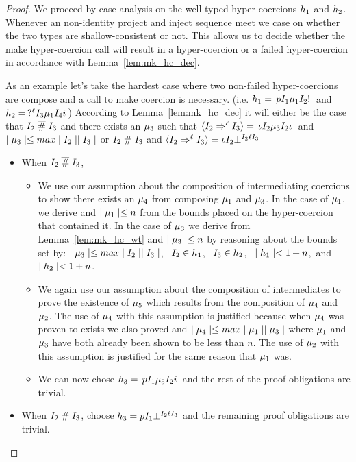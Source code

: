 \documentclass[acmtog, authorversion, acmlarge]{acmart}
\begin{document}
\begin{proof}
  We proceed by case analysis on the well-typed hyper-coercions
  $h_1$ and $h_2$. Whenever an non-identity project and
  inject sequence meet we case on whether the two types are
  shallow-consistent or not. This allows us to decide whether
  the make hyper-coercion call will result in a hyper-coercion
  or a failed hyper-coercion in accordance with
  Lemma~\ref{lem:mk_hc_dec}.

  As an example let's take the hardest case where two non-failed
  hyper-coercions are compose and a call to make coercion is necessary.
  (i.e. $h_1 = \, p I_{1} \mu_1 I_{2}  ! \,$
  and $h_2 = \,  ?^{\ell} I_{3} \mu_1 I_{4} i \,$)
  According to Lemma~\ref{lem:mk_hc_dec} it will either be
  the case that
  $I_{2} \; \overline{\#} \; I_{3}$ and
  there exists an $\mu_3$ such that
  $\langle I_{2} \Rightarrow^{\ell} I_{3} \rangle = \, \iota_{} I_{2} \mu_3 I_{2} \iota_{} \,$
  and $\mid \mu_3 \mid \le max \mid I_{2} \mid\mid I_{3} \mid$
  or
  $I_{2} \; \# \; I_{3}$ and
  $\langle I_{2} \Rightarrow^{\ell} I_{3} \rangle = \iota_{} I_{2} \bot^{I_2 \ell I_{3}}$
  \begin{itemize}
  \item When $I_{2} \; \overline{\#} \; I_{3}$,
      \begin{itemize}
      \item We use our assumption about the composition of
        intermediating coercions to show there exists an $\mu_4$ from
        composing $\mu_1$ and $\mu_3$.  In the case of $\mu_1$,
        we derive  and $\mid \mu_1 \mid \le n$
        from the bounds placed on the hyper-coercion that contained it.
        In the case of $\mu_3$ we derive  from
        Lemma~\ref{lem:mk_hc_wt} and $\mid \mu_3 \mid \le n$ by
        reasoning about the bounds set by:
        $\mid \mu_3 \mid \le max \mid I_{2} \mid\mid I_{3} \mid$, \, 
        $I_2 \in h_1$, \,
        $I_3 \in h_2$, \,
        $\mid h_1 \mid < 1 + n$,\,
        and $\mid h_2 \mid < 1 + n$. 
      \item We again use our assumption about the composition
        of intermediates to prove the existence of $\mu_5$ which
        results from the composition of $\mu_4$ and $\mu_2$.
        The use of $\mu_4$ with this assumption is justified
        because when $\mu_4$ was proven to exists we also
        proved  and
        $\mid \mu_4 \mid \le max \mid \mu_1 \mid \mid \mu_3 \mid$ where
        $\mu_1$ and $\mu_3$ have both already been shown to be
        less than $n$. The use of $\mu_2$ with this assumption
        is justified for the same reason that $\mu_1$ was.
      \item We can now chose
        $h_3 = \, p I_1 \mu_5 I_2 i \,$ and the
        rest of the proof obligations are trivial. 
      \end{itemize}
    \item When $I_{2} \; \# \; I_{3}$, choose
      $h_3 = p I_{1} \bot^{I_2 \ell I_{3}}$ and the
      remaining proof obligations are trivial.
  \end{itemize}
\end{proof}
\end{document}
